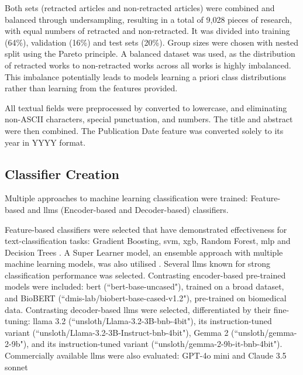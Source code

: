 \documentclass[pdflatex,sn-mathphys-num]{sn-jnl}
\begin{document}
Both sets (retracted articles and non-retracted articles) were combined and balanced through undersampling, resulting in a total of 9,028 pieces of research, with equal numbers of retracted and non-retracted. It was divided into training (64\%), validation (16\%) and test sets (20\%). Group sizes were chosen with nested split using the Pareto principle.  A balanced dataset was used, as the distribution of retracted works to non-retracted works across all works is highly imbalanced. This imbalance potentially leads to models learning a priori class distributions rather than learning from the features provided.


All textual fields were preprocessed by converted to lowercase, and eliminating non-ASCII characters, special punctuation, and numbers. The title and abstract were then combined. The Publication Date feature was converted solely to its year in YYYY format.


\subsection{Classifier Creation}\label{sec:Materials and Methods}

Multiple approaches to machine learning classification were trained: Feature-based and \glspl*{llm} (Encoder-based and Decoder-based) classifiers.


Feature-based classifiers were selected that have demonstrated effectiveness for text-classification tasks: Gradient Boosting, \gls*{svm}, \gls*{xgb}, Random Forest, \gls*{mlp} and Decision Trees \cite{sebastiani2002machine,li2022survey}. A Super Learner model, an ensemble approach with multiple machine learning models, was also utilised \cite{van_noorden_more_2023}. Several \glspl*{llm} known for strong classification performance was selected.  Contrasting encoder-based pre-trained models were included: \gls*{bert} (``bert-base-uncased"), trained on a broad dataset, and BioBERT (``dmis-lab/biobert-base-cased-v1.2"), pre-trained on biomedical data.  Contrasting decoder-based \glspl*{llm} were selected, differentiated by their fine-tuning: \gls*{llama} 3.2 (``unsloth/Llama-3.2-3B-bnb-4bit"), its instruction-tuned variant (``unsloth/Llama-3.2-3B-Instruct-bnb-4bit"), Gemma 2 (``unsloth/gemma-2-9b"), and its instruction-tuned variant (``unsloth/gemma-2-9b-it-bnb-4bit"). Commercially available \glspl*{llm} were also evaluated: GPT-4o mini \cite{noauthor_openai_nodate} and Claude 3.5 sonnet \cite{noauthor_introducing_nodate}
\end{document}
